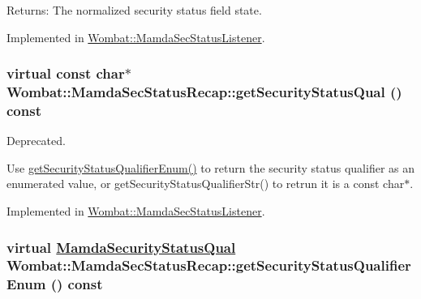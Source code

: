 \begin{Desc}
\item[Returns:]The normalized security status field state. \end{Desc}


Implemented in \hyperlink{classWombat_1_1MamdaSecStatusListener_3ab7eddbc0cb17286b8d14330470a927}{Wombat::Mamda\-Sec\-Status\-Listener}.\hypertarget{classWombat_1_1MamdaSecStatusRecap_a33dfbf74883ec2304a39edc9e87b477}{
\subsubsection[getSecurityStatusQual]{\setlength{\rightskip}{0pt plus 5cm}virtual const char$\ast$ Wombat::Mamda\-Sec\-Status\-Recap::get\-Security\-Status\-Qual () const}}
\label{classWombat_1_1MamdaSecStatusRecap_a33dfbf74883ec2304a39edc9e87b477}


Deprecated. 

Use \hyperlink{classWombat_1_1MamdaSecStatusRecap_3e290ab8d414a7f40d224bdf4518da02}{get\-Security\-Status\-Qualifier\-Enum()} to return the security status qualifier as an enumerated value, or get\-Security\-Status\-Qualifier\-Str() to retrun it is a const char$\ast$. 

Implemented in \hyperlink{classWombat_1_1MamdaSecStatusListener_c94de1b4d8e9377a219ce488fa7ef16c}{Wombat::Mamda\-Sec\-Status\-Listener}.\hypertarget{classWombat_1_1MamdaSecStatusRecap_3e290ab8d414a7f40d224bdf4518da02}{
\subsubsection[getSecurityStatusQualifierEnum]{\setlength{\rightskip}{0pt plus 5cm}virtual \hyperlink{namespaceWombat_2de6f22c731ba94169dc24b8054862b8}{Mamda\-Security\-Status\-Qual} Wombat::Mamda\-Sec\-Status\-Recap::get\-Security\-Status\-Qualifier\-Enum () const}}
\label{classWombat_1_1MamdaSecStatusRecap_3e290ab8d414a7f40d224bdf4518da02}


